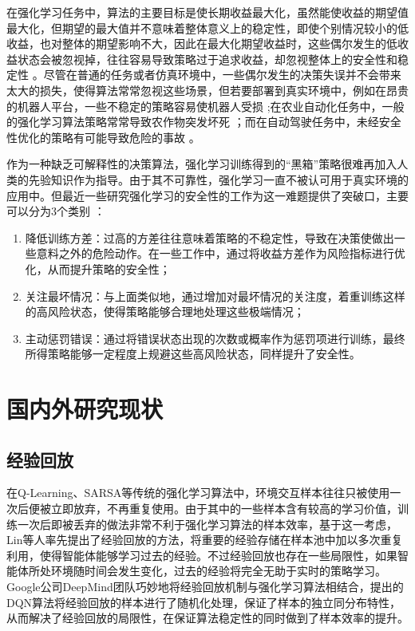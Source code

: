 在强化学习任务中，算法的主要目标是使长期收益最大化，虽然能使收益的期望值最大化，但期望的最大值并不意味着整体意义上的稳定性，即使个别情况较小的低收益，也对整体的期望影响不大，因此在最大化期望收益时，这些偶尔发生的低收益状态会被忽视掉，往往容易导致策略过于追求收益，却忽视整体上的安全性和稳定性 \cite{garcia2015comprehensive}。尽管在普通的任务或者仿真环境中，一些偶尔发生的决策失误并不会带来太大的损失，使得算法常常忽视这些场景，但若要部署到真实环境中，例如在昂贵的机器人平台，一些不稳定的策略容易使机器人受损 \cite{kormushev2010robot};在农业自动化任务中，一般的强化学习算法策略常常导致农作物突发坏死 \cite{bu2019smart}；而在自动驾驶任务中，未经安全性优化的策略有可能导致危险的事故 \cite{sallab2017deep}。

作为一种缺乏可解释性的决策算法，强化学习训练得到的“黑箱”策略很难再加入人类的先验知识作为指导。由于其不可靠性，强化学习一直不被认可用于真实环境的应用中。但最近一些研究强化学习的安全性的工作为这一难题提供了突破口，主要可以分为3个类别 \cite{munos2016safe}：

\begin{enumerate}
    \item 降低训练方差：过高的方差往往意味着策略的不稳定性，导致在决策使做出一些意料之外的危险动作。在一些工作中，通过将收益方差作为风险指标进行优化，从而提升策略的安全性；
    \item 关注最坏情况：与上面类似地，通过增加对最坏情况的关注度，着重训练这样的高风险状态，使得策略能够合理地处理这些极端情况；
    \item 主动惩罚错误：通过将错误状态出现的次数或概率作为惩罚项进行训练，最终所得策略能够一定程度上规避这些高风险状态，同样提升了安全性。
\end{enumerate}

\section{国内外研究现状}

\subsection{经验回放}

在Q-Learning、SARSA等传统的强化学习算法中，环境交互样本往往只被使用一次后便被立即放弃，不再重复使用。由于其中的一些样本含有较高的学习价值，训练一次后即被丢弃的做法非常不利于强化学习算法的样本效率，基于这一考虑，Lin等人率先提出了经验回放的方法，将重要的经验存储在样本池中加以多次重复利用，使得智能体能够学习过去的经验。不过经验回放也存在一些局限性，如果智能体所处环境随时间会发生变化，过去的经验将完全无助于实时的策略学习。Google公司DeepMind团队巧妙地将经验回放机制与强化学习算法相结合，提出的DQN算法将经验回放的样本进行了随机化处理，保证了样本的独立同分布特性，从而解决了经验回放的局限性，在保证算法稳定性的同时做到了样本效率的提升。

